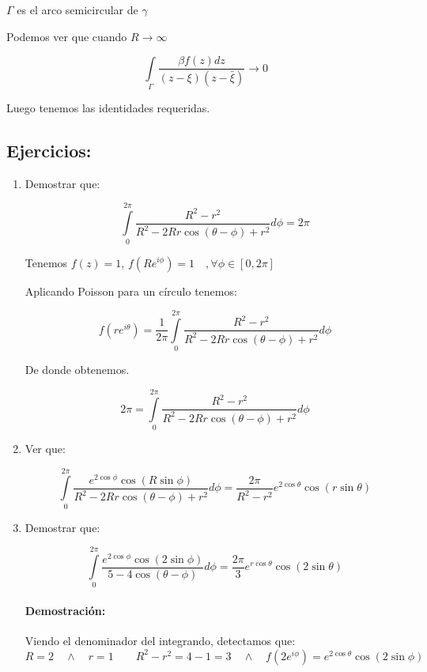 \documentclass[a4paper,12pt]{article}
\begin{document}
$\Gamma$ es el arco semicircular de $\gamma$

Podemos ver que cuando $R \to \infty$

\[
\int\limits_{\Gamma} \frac{\beta f(z) dz}{(z - \xi)(z - \bar{\xi})} \to 0
\]

Luego tenemos las identidades requeridas.

\subsection{Ejercicios:}

\begin{enumerate}
    \item Demostrar que:

        \[
        \int\limits_{0}^{2\pi} \frac{R^2 - r^2}{R^2 - 2Rr \cos(\theta - \phi) + r^2} d\phi = 2\pi
        \]
        
        Tenemos $f(z) = 1$, $f(Re^{i\phi}) = 1 \quad ,\forall \phi \in [0, 2\pi]$
        
        Aplicando Poisson para un círculo tenemos:
        
        \[
        f(re^{i\theta}) = \frac{1}{2\pi} \int\limits_{0}^{2\pi} \frac{R^2 - r^2}{R^2 - 2Rr \cos(\theta - \phi) + r^2} d\phi
        \]
        
        De donde obtenemos.
        
        
        \[
        2\pi = \int\limits_{0}^{2\pi} \frac{R^2 - r^2}{R^2 - 2Rr \cos(\theta - \phi) + r^2} d\phi
        \]

\item Ver que:

\[
\int\limits_{0}^{2\pi} \frac{e^{2 \cos \phi} \cos(R \sin \phi)}{R^2 - 2Rr \cos(\theta - \phi) + r^2} d\phi = \frac{2\pi}{R^2 - r^2} e^{2 \cos \theta} \cos(r \sin \theta)
\]

\item Demostrar que:

\[
\int\limits_{0}^{2\pi} \frac{e^{2 \cos \phi} \cos(2 \sin \phi)}{5 - 4 \cos(\theta - \phi)} d\phi = \frac{2\pi}{3} e^{r \cos \theta} \cos(2 \sin \theta)
\]

\paragraph{Demostración:}

Viendo el denominador del integrando, detectamos que:
\[
R = 2 \quad \wedge \quad r = 1 \quad \quad R^2 - r^2 = 4 - 1 = 3 \quad \wedge \quad f(2e^{i\phi}) = e^{2 \cos \theta} \cos(2 \sin \phi)
\]


\end{enumerate}
\end{document}
